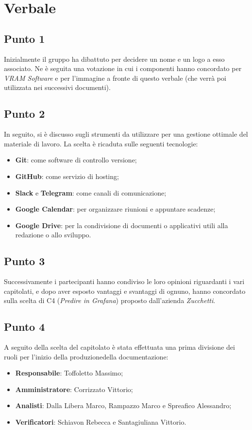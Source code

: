 \section{Verbale}
    \subsection{Punto 1}
        Inizialmente il gruppo ha dibattuto per decidere un nome e un logo a esso associato. Ne è seguita una votazione in cui i componenti hanno
        concordato per \textit{VRAM Software} e per l'immagine a fronte di questo verbale (che verrà poi utilizzata nei successivi documenti).
    \subsection{Punto 2}
        In seguito, si è discusso sugli strumenti da utilizzare per una gestione ottimale del materiale di lavoro. La scelta è ricaduta sulle seguenti tecnologie:
        \begin{itemize}
            \item \textbf{Git}: come software di controllo versione;
            \item \textbf{GitHub}: come servizio di hosting;
            \item \textbf{Slack} e \textbf{Telegram}: come canali di comunicazione;
            \item \textbf{Google Calendar}: per organizzare riunioni e appuntare scadenze;
            \item \textbf{Google Drive}: per la condivisione di documenti o applicativi utili alla redazione o allo sviluppo.
        \end{itemize}
    \subsection{Punto 3}
        Successivamente i partecipanti hanno condiviso le loro opinioni riguardanti i vari capitolati\glo, e dopo aver esposto vantaggi e svantaggi di ognuno, hanno concordato sulla scelta di C4 (\textit{Predire in Grafana}\glo) proposto dall'azienda \textit{Zucchetti}.
    \subsection{Punto 4}
        A seguito della scelta del capitolato è stata effettuata una prima divisione dei ruoli per l'inizio della produzione\glosp della documentazione:
        \begin{itemize}
            \item \textbf{Responsabile}: Toffoletto Massimo;
            \item \textbf{Amministratore}: Corrizzato Vittorio;
            \item \textbf{Analisti}: Dalla Libera Marco, Rampazzo Marco e Spreafico Alessandro;
            \item \textbf{Verificatori}: Schiavon Rebecca e Santagiuliana Vittorio.
        \end{itemize}
